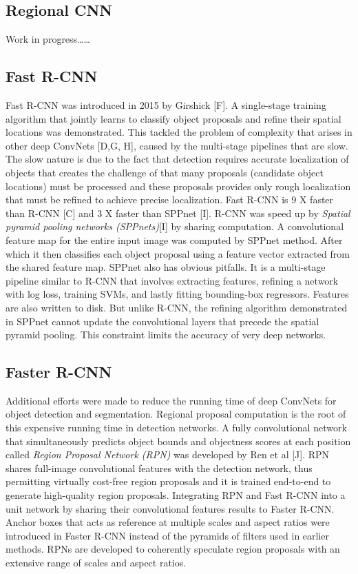 \subsection{Regional CNN}\label{s:nnevo-rcnn}

Work in progress\dots\dots

\subsection{Fast R-CNN}\label{s:nnevo-fastrcnn}

Fast R-CNN was introduced in 2015 by Girshick [F]. A single-stage training algorithm that jointly learns to classify object proposals and refine their spatial locations was demonstrated. This tackled the problem of complexity that arises in other deep ConvNets [D,G, H], caused by the multi-stage pipelines that are slow. The slow nature is due to the fact that detection requires accurate localization of objects that creates the challenge of that many proposals (candidate object locations) must be processed and these proposals provides only rough localization that must be refined to achieve precise localization. Fast R-CNN is 9 X faster than R-CNN [C] and 3 X faster than SPPnet [I]. R-CNN was speed up by \emph{Spatial pyramid pooling networks (SPPnets)}[I] by sharing computation. A convolutional feature map for the entire input image was computed by SPPnet method. After which it then classifies each object proposal using a feature vector extracted from the shared feature map. SPPnet also has obvious pitfalls. It is a multi-stage pipeline similar to R-CNN that involves extracting features, refining a network with log loss, training SVMs, and lastly fitting bounding-box regressors. Features are also written to disk. But unlike R-CNN, the refining algorithm demonstrated in SPPnet cannot update the convolutional layers that precede the spatial pyramid pooling. This constraint limits the accuracy of very deep networks.

\subsection{Faster R-CNN}\label{s:nnevo-fasterrcnn}

Additional efforts were made to reduce the running time of deep ConvNets for object detection and segmentation. Regional proposal computation is the root of this expensive running time in detection networks. A fully convolutional network that simultaneously predicts object bounds and objectness scores at each position called \emph{ Region Proposal Network (RPN) }was developed by Ren et al [J]. RPN shares full-image convolutional features with the detection network, thus permitting virtually cost-free region proposals and it is trained end-to-end to generate high-quality region proposals. Integrating RPN and Fast R-CNN into a unit network by sharing their convolutional features results to Faster R-CNN. Anchor boxes that acts as reference at multiple scales and aspect ratios were introduced in Faster R-CNN instead of the pyramids of filters used in earlier methods. RPNs are developed to coherently speculate region proposals with an extensive range of scales and aspect ratios.

